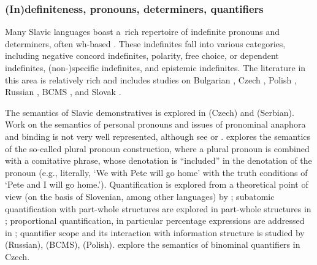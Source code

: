 \documentclass[output=paper,colorlinks,citecolor=brown]{langscibook}
\begin{document}
\subsubsection{(In)definiteness, pronouns, determiners, quantifiers%
} Many Slavic languages boast a~rich repertoire of indefinite pronouns and determiners, often wh-based \citep[cf.][]{Haspelmath1997}. These indefinites fall into various categories, including negative concord indefinites, polarity, free choice, or dependent indefinites, (non-)specific indefinites, and epistemic indefinites. The literature in this area is relatively rich and includes studies on Bulgarian \citep{izvorski94,%
Koev2017}, Czech \citep{Docekal2011,simik15,Strachonova2016}, Polish \citep{Blaszczak2001,blaszczak03}, Russian \citep{Pereltsvaig2000,pereltsvaig04,pereltsvaig08,yanovich05,yanovich08,Geist2008,Kagan2011,Ionin2013, Marti.Ionin2019}, BCMS \citep{Progovac1993a,gajic16a}, and Slovak \citep{Richtarcikova2015}. 

The semantics of Slavic demonstratives is explored in \citet{simik16,Simik2021} (Czech) and \citet{arsenijevic18} (Serbian). Work on the semantics of personal pronouns and issues of pronominal anaphora and binding is not very well represented, although see \citet{podobryaevivlieva08} or \citet{vassilieva-larson05}. \citet{Butschety2025} explores the semantics of the so-called plural pronoun construction, where a plural pronoun is combined with a comitative phrase, whose denotation is ``included'' in the denotation of the pronoun (e.g., literally, `We with Pete will go home' with the truth conditions of `Pete and I will go home.'). Quantification is explored from a theoretical point of view (on the basis of Slovenian, among other languages) by \citet{zivanovic07}; subatomic quantification with part-whole structures are explored in part-whole structures in \citet{wagiel21}; proportional quantification, in particular percentage expressions are addressed in \citet{gehrkewagiel}; quantifier scope and its interaction with information structure is studied by \citet{ionin02, antonyukdiss, ionin-luchkina18} (Russian), \citet{godjevac} (BCMS),  \citet{abelsgrabska} (Polish). \citet{Docekal.Simik2021} explore the semantics of binominal quantifiers in Czech.
\end{document}
